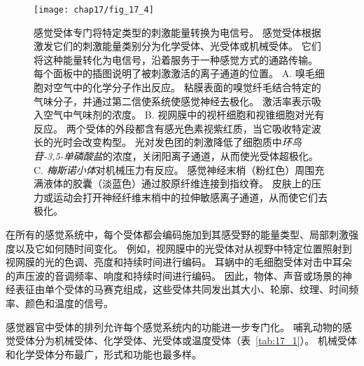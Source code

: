 \begin{figure}[htbp]
	\centering
	\texttt{[image: chap17/fig\_17\_4]}
	\caption{感觉受体专门将特定类型的刺激能量转换为电信号。 
		感觉受体根据激发它们的刺激能量类别分为化学受体、光受体或机械受体。
		它们将这种能量转化为电信号，沿着服务于一种感觉方式的通路传输。
		每个面板中的插图说明了被刺激激活的离子通道的位置。
		A. 嗅毛细胞对空气中的化学分子作出反应。
		粘膜表面的嗅觉纤毛结合特定的气味分子，并通过第二信使系统使感觉神经去极化。
		激活率表示吸入空气中气味剂的浓度。
		B. 视网膜中的视杆细胞和视锥细胞对光有反应。
		两个受体的外段都含有感光色素视紫红质，当它吸收特定波长的光时会改变构型。
		光对发色团的刺激降低了细胞质中\textit{环鸟苷-3,5-单磷酸盐}的浓度，关闭阳离子通道，从而使光受体超极化。
		C. \textit{梅斯诺小体}对机械压力有反应。 
		感觉神经末梢（粉红色）周围充满液体的胶囊（淡蓝色）通过胶原纤维连接到指纹脊。
		皮肤上的压力或运动会打开神经纤维末梢中的拉伸敏感离子通道，从而使它们去极化\cite{albe1973morphology}。}
	\label{fig:17_4}
\end{figure}


在所有的感觉系统中，每个受体都会编码施加到其感受野的能量类型、局部刺激强度以及它如何随时间变化。
例如，视网膜中的光受体对从视野中特定位置照射到视网膜的光的色调、亮度和持续时间进行编码。
耳蜗中的毛细胞受体对击中耳朵的声压波的音调频率、响度和持续时间进行编码。
因此，物体、声音或场景的神经表征由单个受体的马赛克组成，这些受体共同发出其大小、轮廓、纹理、时间频率、颜色和温度的信号。


感觉器官中受体的排列允许每个感觉系统内的功能进一步专门化。 
哺乳动物的感觉受体分为机械受体、化学受体、光受体或温度受体（表~\ref{tab:17_1}）。
机械受体和化学受体分布最广，形式和功能也最多样。


